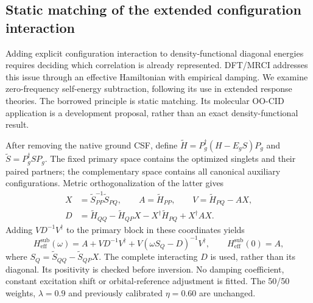 \subsection{Static matching of the extended configuration interaction}
Adding explicit configuration interaction to density-functional diagonal
energies requires deciding which correlation is already represented.
DFT/MRCI addresses this
issue through an effective Hamiltonian with empirical damping.\cite{marian2019mrci}
We examine zero-frequency self-energy subtraction, following its use in
extended response theories.\cite{tselyaev2013,gambacurta2015}
The borrowed principle is static matching. Its molecular OO-CID application
is a development proposal, rather than an exact density-functional result.

After removing the native ground CSF, define
$\widetilde H=P_g^\dagger(H-E_gS)P_g$ and
$\widetilde S=P_g^\dagger SP_g$. The fixed primary space contains the
optimized singlets and their paired partners; the complementary space
contains all canonical auxiliary configurations. Metric orthogonalization
of the latter gives
\begin{align}
 X&=\widetilde S_{PP}^{-1}\widetilde S_{PQ},\qquad
 A=\widetilde H_{PP},\qquad V=\widetilde H_{PQ}-AX,\\
 D&=\widetilde H_{QQ}-\widetilde H_{QP}X
       -X^\dagger\widetilde H_{PQ}+X^\dagger AX.
\end{align}
Adding $VD^{-1}V^\dagger$ to the primary block in these coordinates yields
\begin{equation}
 H_{\mathrm{eff}}^{\mathrm{sub}}(\omega)
 =A+VD^{-1}V^\dagger+V(\omega S_Q-D)^{-1}V^\dagger,
 \qquad H_{\mathrm{eff}}^{\mathrm{sub}}(0)=A ,
\end{equation}
where $S_Q=\widetilde S_{QQ}-\widetilde S_{QP}X$.
The complete interacting $D$ is used, rather than its diagonal. Its
positivity is checked before inversion. No damping coefficient, constant
excitation shift or orbital-reference adjustment is fitted. The 50/50
weights, $\lambda=0.9$ and previously calibrated $\eta=0.60$ are unchanged.

